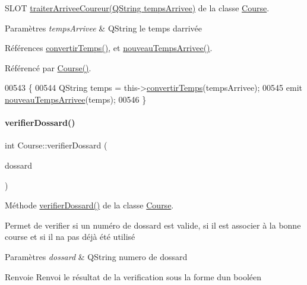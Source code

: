 S\+L\+OT \hyperlink{class_course_a60073d16efd4ccefa81bddb4aaa88fab}{traiter\+Arrivee\+Coureur(\+Q\+String temps\+Arrivee)} de la classe \hyperlink{class_course}{Course}. 


\begin{DoxyParams}{Paramètres}
{\em temps\+Arrivee} & Q\+String le temps d\textquotesingle{}arrivée \\
\hline
\end{DoxyParams}


Références \hyperlink{class_course_ab98bbd1a92e468df7b8b45bb7877afef}{convertir\+Temps()}, et \hyperlink{class_course_abea30de9b6cec333bf19134608e5bccf}{nouveau\+Temps\+Arrivee()}.



Référencé par \hyperlink{class_course_af6317ecab95f8a2eb205b4f91b530992}{Course()}.


\begin{DoxyCode}
00543 \{
00544     QString temps = this->\hyperlink{class_course_ab98bbd1a92e468df7b8b45bb7877afef}{convertirTemps}(tempsArrivee);
00545     emit \hyperlink{class_course_abea30de9b6cec333bf19134608e5bccf}{nouveauTempsArrivee}(temps);
00546 \}
\end{DoxyCode}
\mbox{\label{class_course_a6cb3ede6a11e4813f95be92f4459a3c2}} 
\paragraph{\texorpdfstring{verifier\+Dossard()}{verifierDossard()}}
{\footnotesize\ttfamily int Course\+::verifier\+Dossard (\begin{DoxyParamCaption}\item[{Q\+String}]{dossard }\end{DoxyParamCaption})}



Méthode \hyperlink{class_course_a6cb3ede6a11e4813f95be92f4459a3c2}{verifier\+Dossard()} de la classe \hyperlink{class_course}{Course}. 

Permet de verifier si un numéro de dossard est valide, si il est associer à la bonne course et si il n\textquotesingle{}a pas déjà été utilisé 
\begin{DoxyParams}{Paramètres}
{\em dossard} & Q\+String numero de dossard \\
\hline
\end{DoxyParams}
\begin{DoxyReturn}{Renvoie}
Renvoi le résultat de la verification sous la forme d\textquotesingle{}un booléen 
\end{DoxyReturn}


